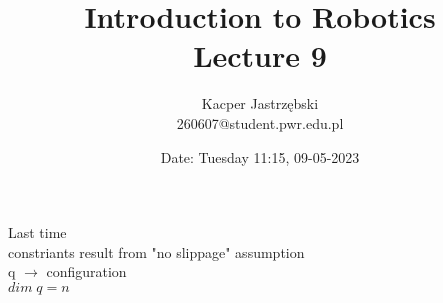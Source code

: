 \documentclass[12pt, a4paper]{extarticle}
\title{
	Introduction to Robotics \\
	\vspace{\baselineskip}
	\large
	\textbf{Lecture 9}
}
\author{
	Kacper Jastrzębski\\
	260607@student.pwr.edu.pl
}
\date{Date: Tuesday 11:15, 09-05-2023}
\begin{document}
	\maketitle
	\vspace{1.5cm}

	\tableofcontents

	\pagebreak

	Last time\\
	constriants result from "no slippage" assumption\\
	q $\rightarrow$ configuration\\
	$dim\;q = n$
\end{document}
